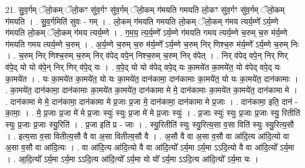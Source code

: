 \documentclass[17pt]{extarticle}
\begin{document}
21. सु॒व॒र्गम् ॅलो॒कम् ॅलो॒कꣳ सु॑व॒र्गꣳ सु॑व॒र्गम् ॅलो॒कम् ग॑मयति गमयति लो॒कꣳ सु॑व॒र्गꣳ सु॑व॒र्गम् ॅलो॒कम् ग॑मयति । . सु॒व॒र्गमिति॑ सुवः - गम् । . लो॒कम् ग॑मयति गमयति लो॒कम् ॅलो॒कम् ग॑मय त्यर्य॒म्णे᳚ ऽर्य॒म्णे ग॑मयति लो॒कम् ॅलो॒कम् ग॑मय त्यर्य॒म्णे । . ग॒म॒य॒ त्य॒र्य॒म्णे᳚ ऽर्य॒म्णे ग॑मयति गमय त्यर्य॒म्णे च॒रुम् च॒रु म॑र्य॒म्णे ग॑मयति गमय त्यर्य॒म्णे च॒रुम् । . अ॒र्य॒म्णे च॒रुम् च॒रु म॑र्य॒म्णे᳚ ऽर्य॒म्णे च॒रुम् निर् णिश्च॒रु म॑र्य॒म्णे᳚ ऽर्य॒म्णे च॒रुम् निः । . च॒रुम् निर् णिश्च॒रुम् च॒रुम् निर् व॑पेद् वपे॒न् निश्च॒रुम् च॒रुम् निर् व॑पेत् । . निर् व॑पेद् वपे॒न् निर् णिर् व॑पे॒द् यो यो व॑पे॒न् निर् णिर् व॑पे॒द् यः । . व॒पे॒द् यो यो व॑पेद् वपे॒द् यः का॒मये॑त का॒मये॑त॒ यो व॑पेद् वपे॒द् यः का॒मये॑त । . यः का॒मये॑त का॒मये॑त॒ यो यः का॒मये॑त॒ दान॑कामा॒ दान॑कामाः का॒मये॑त॒ यो यः का॒मये॑त॒ दान॑कामाः । . का॒मये॑त॒ दान॑कामा॒ दान॑कामाः का॒मये॑त का॒मये॑त॒ दान॑कामा मे मे॒ दान॑कामाः का॒मये॑त का॒मये॑त॒ दान॑कामा मे । . दान॑कामा मे मे॒ दान॑कामा॒ दान॑कामा मे प्र॒जाः प्र॒जा मे॒ दान॑कामा॒ दान॑कामा मे प्र॒जाः । . दान॑कामा॒ इति॒ दान॑ - का॒माः॒ । . मे॒ प्र॒जाः प्र॒जा मे॑ मे प्र॒जाः स्युः॑ स्युः प्र॒जा मे॑ मे प्र॒जाः स्युः॑ । . प्र॒जाः स्युः॑ स्युः प्र॒जाः प्र॒जाः स्यु॒ रितीति॑ स्युः प्र॒जाः प्र॒जाः स्यु॒रिति॑ । . प्र॒जा इति॑ प्र - जाः । . स्यु॒रितीति॑ स्युः स्यु॒रित्य॒सा व॒सा विति॑ स्युः स्यु॒रित्य॒सौ । . इत्य॒सा व॒सा वितीत्य॒सौ वै वा अ॒सा वितीत्य॒सौ वै । . अ॒सौ वै वा अ॒सा व॒सौ वा आ॑दि॒त्य आ॑दि॒त्यो वा अ॒सा व॒सौ वा आ॑दि॒त्यः । . वा आ॑दि॒त्य आ॑दि॒त्यो वै वा आ॑दि॒त्यो᳚ ऽर्य॒मा ऽर्य॒मा ऽऽदि॒त्यो वै वा आ॑दि॒त्यो᳚ ऽर्य॒मा । . आ॒दि॒त्यो᳚ ऽर्य॒मा ऽर्य॒मा ऽऽदि॒त्य आ॑दि॒त्यो᳚ ऽर्य॒मा यो यो᳚ ऽर्य॒मा ऽऽदि॒त्य आ॑दि॒त्यो᳚ ऽर्य॒मा यः । \newline
\end{document}
